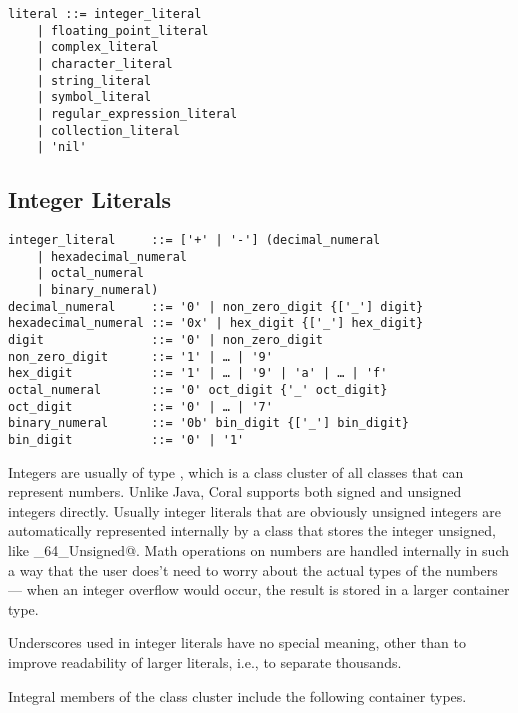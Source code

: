 \syntax\begin{lstlisting}
literal ::= integer_literal
	| floating_point_literal
	| complex_literal
	| character_literal
	| string_literal
	| symbol_literal
	| regular_expression_literal
	| collection_literal
	| 'nil'
\end{lstlisting}

\subsection{Integer Literals}\label{sec:integerliterals}

\syntax\begin{lstlisting}
integer_literal     ::= ['+' | '-'] (decimal_numeral
	| hexadecimal_numeral
	| octal_numeral
	| binary_numeral)
decimal_numeral     ::= '0' | non_zero_digit {['_'] digit}
hexadecimal_numeral ::= '0x' | hex_digit {['_'] hex_digit}
digit               ::= '0' | non_zero_digit
non_zero_digit      ::= '1' | … | '9'
hex_digit           ::= '1' | … | '9' | 'a' | … | 'f'
octal_numeral       ::= '0' oct_digit {'_' oct_digit}
oct_digit           ::= '0' | … | '7'
binary_numeral      ::= '0b' bin_digit {['_'] bin_digit}
bin_digit           ::= '0' | '1'
\end{lstlisting}

Integers are usually of type \lstinline@Number@, which is a class cluster of all classes that can represent numbers. Unlike Java, Coral supports both signed and unsigned integers directly. Usually integer literals that are obviously unsigned integers are automatically represented internally by a class that stores the integer unsigned, like \lstinline@Integer_64_Unsigned@. Math operations on numbers are handled internally in such a way that the user does't need to worry about the actual types of the numbers — when an integer overflow would occur, the result is stored in a larger container type. 

Underscores used in integer literals have no special meaning, other than to improve readability of larger literals, i.e., to separate thousands.

Integral members of the \lstinline@Number@ class cluster include the following container types. 

